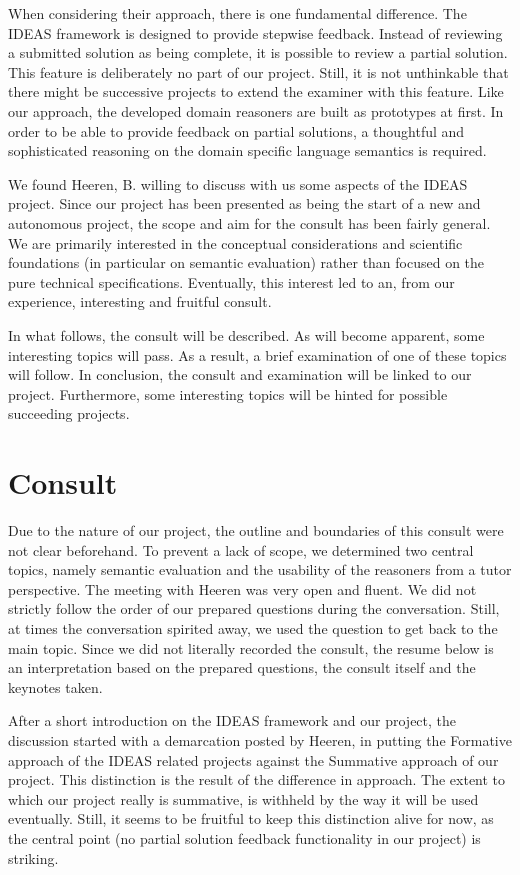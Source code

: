 When considering their approach, there is one fundamental difference. The IDEAS
framework is designed to provide stepwise feedback. Instead of reviewing a
submitted solution as being complete, it is possible to review a partial 
solution. This feature is deliberately no part of our project. Still, it is 
not unthinkable that there might be successive projects to extend the \gls{
examiner} with this feature. Like our approach, the developed domain reasoners 
are built as prototypes at first. In order to be able to provide feedback on partial solutions, a thoughtful and sophisticated reasoning on the domain specific language semantics is required.


We found Heeren, B. willing to discuss with us some aspects of the IDEAS 
project. Since our project has been presented as being the start of a new and 
autonomous project, the scope and aim for the consult has been fairly general. 
We are primarily interested in the conceptual considerations and scientific 
foundations (in particular on semantic evaluation) rather than focused on the 
pure technical specifications. Eventually, this interest led to an, from our 
experience, interesting and fruitful consult. 


In what follows, the consult will be described. As will become apparent, some 
interesting topics will pass. As a result, a brief examination of one of these 
topics will follow. In conclusion, the consult and examination will be linked 
to our project. Furthermore, some interesting topics will be hinted for 
possible succeeding projects.


\section{Consult}
Due to the nature of our project, the outline and boundaries of this consult 
were not clear beforehand. To prevent a lack of scope, we determined two 
central topics, namely semantic evaluation and the usability of the reasoners 
from a tutor perspective. The meeting with Heeren was very open and fluent. We 
did not strictly follow the order of our prepared questions during the 
conversation. Still, at times the 
conversation spirited away, we used the question to get back to the main 
topic. Since we did not literally recorded the consult, the resume below is an 
interpretation based on the prepared questions, the consult itself and the 
keynotes taken.

After a short introduction on the IDEAS framework and our project, the 
discussion started with a demarcation posted by Heeren, in putting the 
Formative approach of the IDEAS related projects against the Summative 
approach of our project. This distinction is the result of the difference in 
approach. The extent to which our project really is summative, is withheld by 
the way it will be used eventually. %
Still, it seems to be fruitful to keep this distinction alive for now, as the 
central point (no partial solution feedback functionality in our project) is 
striking. 

